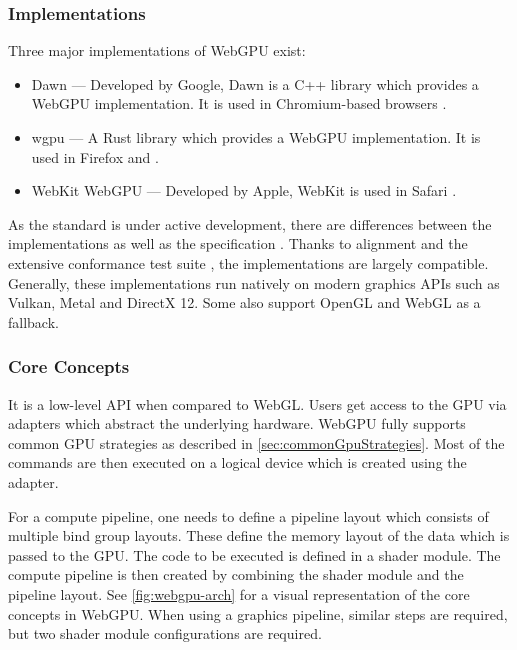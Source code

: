 \subsubsection{Implementations}

Three major implementations of \gls{WebGPU} exist:

\begin{itemize}
    \item{\gls{Dawn}} — Developed by Google, \gls{Dawn} is a C++ library which provides a \gls{WebGPU} implementation. It is used in Chromium-based browsers \cite{dawnImplementation}.
    \item{\gls{wgpu}} — A Rust library which provides a \gls{WebGPU} implementation. It is used in Firefox and  \cite{wgpuImplementation}.
    \item{WebKit WebGPU} — Developed by Apple, WebKit is used in Safari \cite{webKitWebGPUImplementation}.
\end{itemize}

As the standard is under active development, there are differences between the implementations as well as the specification \cite{wgpuStandardDeviation}. Thanks to alignment and the extensive conformance test suite \cite{WebGPUConformanceTestSuite}, the implementations are largely compatible. Generally, these implementations run natively on modern graphics \glspl{API} such as \gls{Vulkan}, \gls{Metal} and \gls{DirectX 12}. Some also support \gls{OpenGL} and \gls{WebGL} as a fallback.

\subsubsection{Core Concepts}

It is a low-level \gls{API} when compared to \gls{WebGL}. Users get access to the \gls{GPU} via adapters which abstract the underlying hardware. \gls{WebGPU} fully supports common \gls{GPU} strategies as described in \autoref{sec:commonGpuStrategies}. Most of the commands are then executed on a logical device which is created using the adapter.

For a compute pipeline, one needs to define a pipeline layout which consists of multiple bind group layouts. These define the memory layout of the data which is passed to the \gls{GPU}. The code to be executed is defined in a shader module. The compute pipeline is then created by combining the shader module and the pipeline layout. See \autoref{fig:webgpu-arch} for a visual representation of the core concepts in \gls{WebGPU}. When using a graphics pipeline, similar steps are required, but two shader module configurations are required.

